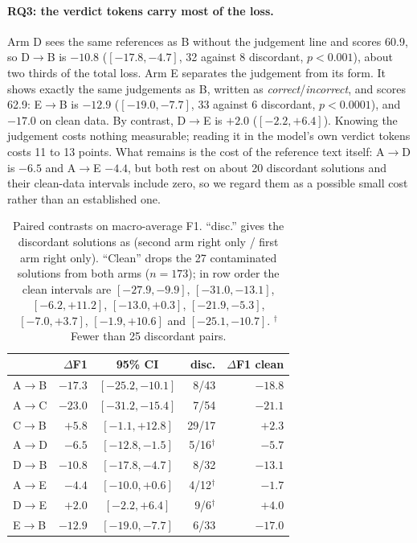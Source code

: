 \documentclass[11pt]{article}
\newcommand{\arm}[1]{\textsc{#1}}
\begin{document}
\paragraph{RQ3: the verdict tokens carry most of the loss.} Arm \arm{D} sees the same
references as \arm{B} without the judgement line and scores 60.9, so \arm{D}$\to$\arm{B} is
$-10.8$ ($[-17.8, -4.7]$, 32 against 8 discordant, $p<0.001$), about two thirds of the total
loss. Arm \arm{E} separates the judgement from its form. It shows exactly the same judgements as
\arm{B}, written as \emph{correct}/\emph{incorrect}, and scores 62.9: \arm{E}$\to$\arm{B} is
$-12.9$ ($[-19.0, -7.7]$, 33 against 6 discordant, $p<0.0001$), and $-17.0$ on clean data. By
contrast, \arm{D}$\to$\arm{E} is $+2.0$ ($[-2.2, +6.4]$). Knowing the judgement costs nothing
measurable; reading it in the model's own verdict tokens costs 11 to 13 points. What remains is
the cost of the reference text itself: \arm{A}$\to$\arm{D} is $-6.5$ and \arm{A}$\to$\arm{E}
$-4.4$, but both rest on about 20 discordant solutions and their clean-data intervals include
zero, so we regard them as a possible small cost rather than an established one.

\begin{table}[t]
\centering
\small
\setlength{\tabcolsep}{3.5pt}
\begin{tabular}{lrcrr}
\toprule
 & $\Delta$F1 & 95\% CI & disc. & $\Delta$F1 clean \\
\midrule
\arm{A}$\to$\arm{B} & $-17.3$ & $[-25.2, -10.1]$ & 8/43 & $-18.8$ \\
\arm{A}$\to$\arm{C} & $-23.0$ & $[-31.2, -15.4]$ & 7/54 & $-21.1$ \\
\arm{C}$\to$\arm{B} & $+5.8$ & $[-1.1, +12.8]$ & 29/17 & $+2.3$ \\
\arm{A}$\to$\arm{D} & $-6.5$ & $[-12.8, -1.5]$ & 5/16$^\dagger$ & $-5.7$ \\
\arm{D}$\to$\arm{B} & $-10.8$ & $[-17.8, -4.7]$ & 8/32 & $-13.1$ \\
\arm{A}$\to$\arm{E} & $-4.4$ & $[-10.0, +0.6]$ & 4/12$^\dagger$ & $-1.7$ \\
\arm{D}$\to$\arm{E} & $+2.0$ & $[-2.2, +6.4]$ & 9/6$^\dagger$ & $+4.0$ \\
\arm{E}$\to$\arm{B} & $-12.9$ & $[-19.0, -7.7]$ & 6/33 & $-17.0$ \\
\bottomrule
\end{tabular}
\caption{Paired contrasts on macro-average F1. ``disc.'' gives the discordant solutions as
(second arm right only / first arm right only). ``Clean'' drops the 27 contaminated solutions
from both arms ($n=173$); in row order the clean intervals are $[-27.9,-9.9]$,
$[-31.0,-13.1]$, $[-6.2,+11.2]$, $[-13.0,+0.3]$, $[-21.9,-5.3]$, $[-7.0,+3.7]$, $[-1.9,+10.6]$
and $[-25.1,-10.7]$. $^\dagger$Fewer than 25 discordant pairs.}
\label{tab:contrasts}
\end{table}
\end{document}
